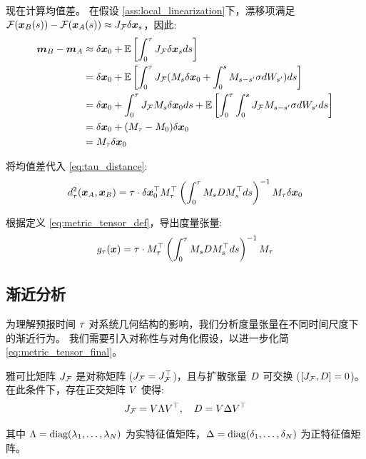 现在计算均值差。
在假设 \ref{ass:local_linearization}下，漂移项满足 $\mathcal{F}(\bm{x}_B(s)) - \mathcal{F}(\bm{x}_A(s)) \approx J_{\mathcal{F}} \delta\bm{x}_s$，因此:
\begin{align*}
    \bm{m}_B - \bm{m}_A &\approx \delta\bm{x}_0 + \mathbb{E}\left[\int_0^{\tau} J_{\mathcal{F}} \delta\bm{x}_s ds\right] \\
    &= \delta\bm{x}_0 + \mathbb{E}\left[\int_0^{\tau} J_{\mathcal{F}} (M_s \delta\bm{x}_0 + \int_0^s M_{s-s^\prime} \sigma dW_{s^\prime}) ds\right] \\
    &= \delta\bm{x}_0 + \int_0^{\tau} J_{\mathcal{F}} M_s \delta\bm{x}_0 ds + \mathbb{E}\left[\int_0^{\tau} \int_0^s J_{\mathcal{F}} M_{s-s^\prime} \sigma dW_{s^\prime} ds\right] \\
    &= \delta\bm{x}_0 + (M_{\tau} - M_0) \delta\bm{x}_0 \\
    &= M_{\tau} \delta\bm{x}_0
\end{align*}

将均值差代入 \eqref{eq:tau_distance}:
\begin{equation}
\label{eq:tau_distance_final}
    d_{\tau}^2(\bm{x}_A, \bm{x}_B) = \tau \cdot \delta\bm{x}_0^\top M_{\tau}^\top \left(\int_0^{\tau} M_s D M_s^\top ds\right)^{-1} M_{\tau} \delta\bm{x}_0
\end{equation}

根据定义 \eqref{eq:metric_tensor_def}，导出度量张量:
\begin{equation}
\label{eq:metric_tensor_final}
    g_{\tau}(\bm{x}) = \tau \cdot M_{\tau}^\top \left(\int_0^{\tau} M_s D M_s^\top ds\right)^{-1} M_{\tau}
\end{equation}

\subsection{渐近分析}

为理解预报时间 $\tau$ 对系统几何结构的影响，我们分析度量张量在不同时间尺度下的渐近行为。
我们需要引入对称性与对角化假设，以进一步化简 \eqref{eq:metric_tensor_final}。

\begin{assumption}[对称性与对角化]
\label{ass:commuting_matrices}
    雅可比矩阵 $J_{\mathcal{F}}$ 是对称矩阵 ($J_{\mathcal{F}} = J_{\mathcal{F}}^\top$)，且与扩散张量 $D$ 可交换 ($[J_{\mathcal{F}}, D] = 0$)。在此条件下，存在正交矩阵 $V$ 使得:
    \begin{equation}
    \label{eq:simultaneous_diagonalization}
        J_{\mathcal{F}} = V\Lambda V^\top, \quad D = V\Delta V^\top
    \end{equation}

    其中 $\Lambda = \text{diag}(\lambda_1, \ldots, \lambda_N)$ 为实特征值矩阵，$\Delta = \text{diag}(\delta_1, \ldots, \delta_N)$ 为正特征值矩阵。
\end{assumption}


